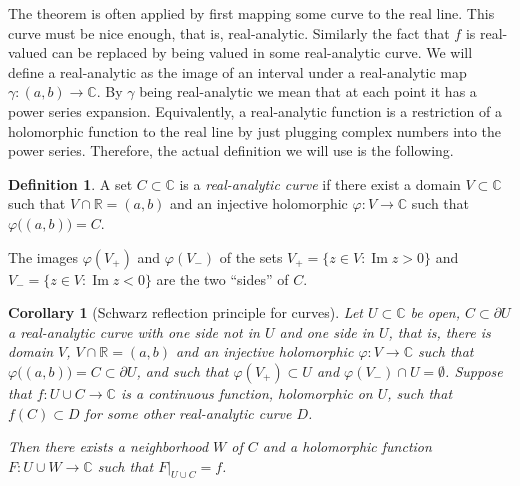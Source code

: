 \documentclass[12pt,openany]{book}
\renewcommand{\Im}{\operatorname{Im}}
\newcommand{\C}{{\mathbb{C}}}
\newcommand{\R}{{\mathbb{R}}}
\newcommand{\myquote}[1]{``#1''}
\theoremstyle{plain}
\newtheorem{cor}[thm]{Corollary}
\theoremstyle{remark}
\theoremstyle{definition}
\newtheorem{defn}[thm]{Definition}
\theoremstyle{exercise}
\theoremstyle{example}
\begin{document}
The theorem is often applied by first mapping some curve to the real line.
This curve must be nice enough, that is, real-analytic.  Similarly the fact
that $f$ is real-valued can be replaced by being valued in some
real-analytic curve.
We will define a real-analytic as the image of
an interval under a
real-analytic map $\gamma \colon (a,b) \to \C$.
By $\gamma$ being real-analytic we mean that at each point it has a power
series expansion.  Equivalently, a real-analytic function is a
restriction of a holomorphic function to the real line by just plugging
complex numbers into the power series.  Therefore, the actual definition we
will use is the following.

\begin{defn}
A set $C \subset \C$ is a \emph{real-analytic curve}
if there exist a domain $V \subset \C$ such that
$V \cap \R = (a,b)$ and an injective holomorphic $\varphi \colon V \to \C$
such that $\varphi\bigl( (a,b) \bigr) = C$.
\end{defn}

The images $\varphi(V_+)$ and $\varphi(V_-)$ of the sets
$V_+ = \{ z \in V : \Im z > 0 \}$ and $V_- = \{ z \in V : \Im z < 0 \}$
are the two \myquote{sides} of $C$.

\begin{cor}[Schwarz reflection principle for curves]
Let $U \subset \C$ be open,
$C \subset \partial U$ a real-analytic curve with one side
not in $U$ and one side in $U$, that is, there is domain $V$,
$V \cap \R = (a,b)$ and an injective holomorphic $\varphi \colon V \to \C$
such that $\varphi\bigl( (a,b) \bigr) = C \subset \partial U$,
and such that $\varphi(V_+) \subset U$ and $\varphi(V_-) \cap U =
\emptyset$.  Suppose that $f \colon U \cup C \to \C$ is a continuous
function, holomorphic on $U$, such that $f(C) \subset D$ for some
other real-analytic curve $D$.

Then there exists a neighborhood $W$ of $C$ and a holomorphic
function $F \colon U \cup W \to \C$ such that $F|_{U \cup C} = f$.
\end{cor}
\end{document}
